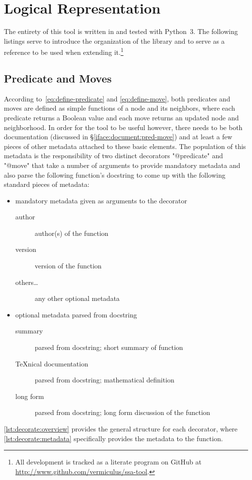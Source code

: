 \section{Logical Representation}
\label{sec:logic-repr}

The entirety of this tool is written in and tested with Python~3.
The following listings serve to introduce the organization of the library and
  to serve as a reference to be used when extending it.\footnote{%
    All development is tracked as a literate program on GitHub
    at \url{http://www.github.com/vermiculus/ssa-tool}.}

\subsection{Predicate and Moves}
\label{sec:logic-repr:predicate-move}

According to~\eqref{eq:define-predicate} and \eqref{eq:define-move},
  both predicates and moves are defined as simple functions of
  a node and its neighbors, where
  each predicate returns a Boolean value and
  each move returns an updated node and neighborhood.
In order for the tool to be useful however,
  there needs to be both documentation (discussed in \S\ref{iface:document:pred-move})
  and at least a few pieces of other metadata attached to these basic elements.
The population of this metadata is the responsibility of two distinct decorators
  \Dash "@predicate" and "@move" \Dash
  that take a number of arguments to provide mandatory metadata
  and also parse the following function's docstring
  to come up with the following standard pieces of metadata:
\begin{itemize}
\item mandatory metadata given as arguments to the decorator
  \begin{description}
  \item[author] author(s) of the function
  \item[version] version of the function
  \item[others\dots] any other optional metadata
  \end{description}
\item optional metadata parsed from docstring
  \begin{description}
  \item[summary] parsed from docstring; short summary of function
  \item[\TeX nical documentation] parsed from docstring; mathematical definition
  \item[long form] parsed from docstring; long form discussion of the function
  \end{description}
\end{itemize}
\autoref{lst:decorate:overview} provides the general structure for each decorator,
  where \autoref{lst:decorate:metadata} specifically provides the metadata to the function.




